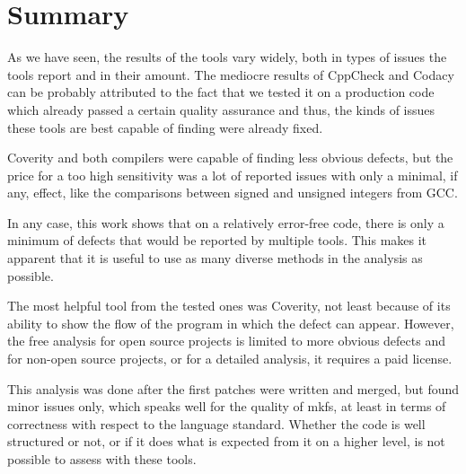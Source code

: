 \section{Summary}\label{chap:results:summary}

As we have seen, the results of the tools vary widely, both in types of issues
the tools report and in their amount.  The mediocre results of CppCheck and
Codacy can be probably attributed to the fact that we tested it on a production
code which already passed a certain quality assurance and thus, the kinds of
issues these tools are best capable of finding were already fixed.

Coverity and both compilers were capable of finding less obvious defects, but
the price for a too high sensitivity was a lot of reported issues with only a
minimal, if any, effect, like the comparisons between signed and unsigned
integers from GCC.

In any case, this work shows that on a relatively error-free code, there is
only a minimum of defects that would be reported by multiple tools. This makes
it apparent that it is useful to use as many diverse methods in the analysis as
possible.

The most helpful tool from the tested ones was Coverity, not least because of
its ability to show the flow of the program in which the defect can appear.
However, the free analysis for open source projects is limited to more obvious
defects and for non-open source projects, or for a detailed analysis, it
requires a paid license.

This analysis was done after the first patches were written and merged, but
found minor issues only, which speaks well for the quality of mkfs, at least in
terms of correctness with respect to the language standard. Whether the code is
well structured or not, or if it does what is expected from it on a higher
level, is not possible to assess with these tools.

